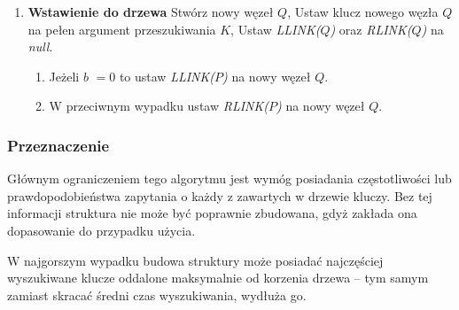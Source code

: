 \begin{enumerate}
\begin{enumerate}
		\end{enumerate}
		\item \textbf{Wstawienie do drzewa} \newline 
		Stwórz nowy węzeł $Q$, \newline 
		Ustaw klucz nowego węzła $Q$ na pełen argument przeszukiwania $K$, \newline 
		Ustaw \emph{LLINK($Q$)} oraz \emph{RLINK($Q$)} na \emph{null}.
		\begin{enumerate}
			\item Jeżeli $b$ $=0$ to ustaw \emph{LLINK($P$)} na nowy węzeł $Q$.
			\item W przeciwnym wypadku ustaw \emph{RLINK($P$)} na nowy węzeł $Q$.
		\end{enumerate}
	\end{enumerate}


	\subsubsection{Przeznaczenie}\label{sec:AlgorytmDPrzeznaczenie}
	
	Głównym ograniczeniem tego algorytmu jest wymóg posiadania częstotliwości lub prawdopodobieństwa zapytania o każdy z zawartych w drzewie kluczy. Bez tej informacji struktura nie może być poprawnie zbudowana, gdyż zakłada ona dopasowanie do przypadku użycia. 
	
	W najgorszym wypadku budowa struktury może posiadać najczęściej wyszukiwane klucze oddalone maksymalnie od korzenia drzewa -- tym samym zamiast skracać średni czas wyszukiwania, wydłuża go.
	

